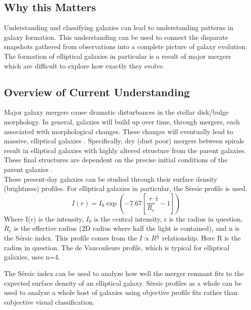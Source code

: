 \documentclass[fleqn,usenatbib]{mnras}
\begin{document}
\subsection{Why this Matters}
Understanding and classifying galaxies can lead to understanding patterns in galaxy formation. This understanding can be used to connect the disparate snapshots gathered from observations into a complete picture of galaxy evolution. The formation of elliptical galaxies in particular is a result of major mergers which are difficult to explore how exactly they evolve. 

\subsection{Overview of Current Understanding}
Major galaxy mergers cause dramatic disturbances in the stellar disk/bulge morphology. In general, galaxies will build up over time, through mergers, each associated with morphological changes. These changes will eventually lead to massive, elliptical galaxies \citep{Duc2013}. 
Specifically, dry (dust poor) mergers between spirals result in elliptical galaxies with highly altered structure from the parent galaxies. These final structures are dependent on the precise initial conditions of the parent galaxies \citep{Querejeta2015}.\\

These present-day galaxies can be studied through their surface density (brightness) profiles. For elliptical galaxies in particular, the S\'ersic profile is used. 
\begin{equation}
    I(r) = I_0\exp(-7.67[\frac{r}{R_e}^\frac{1}{n}-1])
\end{equation}
Where I(r) is the intensity, $I_0$ is the central intensity, r is the radius in question, $R_e$ is the effective radius (2D radius where half the light is contained), and n is the S\'ersic index.
This profile comes from the $I \propto R^{\frac{1}{n}}$ relationship. Here R is the radius in question. The de Vaucouleurs profile, which is typical for elliptical galaxies, uses n=4. 

The S\'ersic index can be used to analyze how well the merger remnant fits to the expected surface density of an elliptical galaxy. S\'ersic profiles as a whole can be used to analyze a whole host of galaxies using objective profile fits rather than subjective visual classification.
\end{document}
